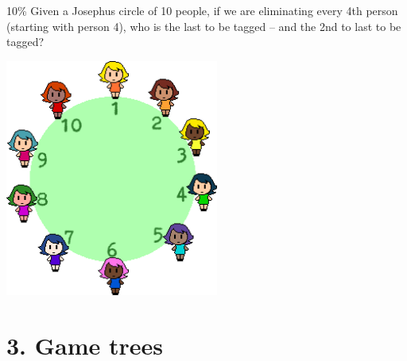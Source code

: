 \documentclass[a4paper,12pt]{book}
\begin{document}
        \begin{question}{5}{10\%}
            Given a Josephus circle of 10 people,
            if we are eliminating every 4th person (starting with person 4),
            who is the last to be tagged – and the 2nd to last to be tagged?

            \begin{center}
                \includegraphics[width=7cm]{images/josephus-10.png}
            \end{center}
        \end{question}
       
    \newpage
    \section*{3. Game trees}
\end{document}
